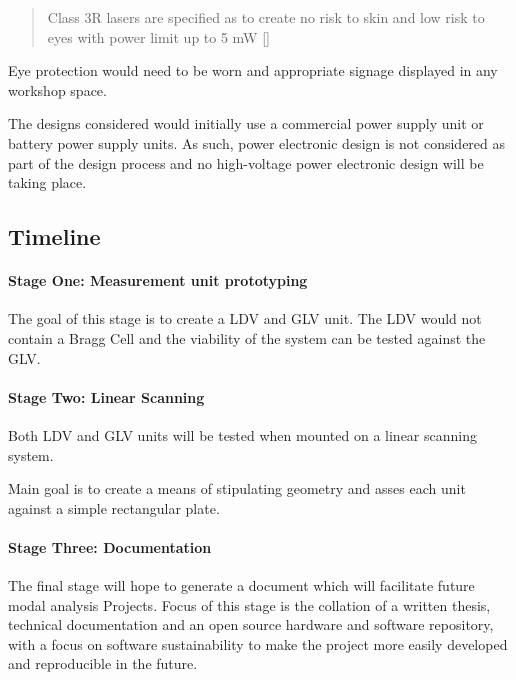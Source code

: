 \begin{quote}
Class 3R lasers are specified as to create no risk to skin and low risk to eyes
with power limit up to 5 mW [\cite{henderson_laser_2003}]
\end{quote}

Eye protection would need to be worn and appropriate signage displayed in any
workshop space.

The designs considered would initially use a commercial power supply unit or
battery power supply units. As such, power electronic design is not considered
as part of the design process and no high-voltage power electronic design will
be taking place.


\hypertarget{timeline}{%
\subsection{Timeline}\label{timeline}}

\paragraph{Stage One: Measurement unit prototyping}

The goal of this stage is to create a LDV and GLV unit. The LDV would not
contain a Bragg Cell and the viability of the system can be tested against the
GLV.

\paragraph{Stage Two: Linear Scanning}

Both LDV and GLV units will be tested when mounted on a linear scanning system.

Main goal is to create a means of stipulating geometry and asses each unit
against a simple rectangular plate.

\paragraph{Stage Three: Documentation}

The final stage will hope to generate a document which will facilitate future
modal analysis Projects. Focus of this stage is the collation of a written
thesis, technical documentation and an open source hardware and software
repository, with a focus on software sustainability to make the project more
easily developed and reproducible in the future.

\subsection{\cite{omodhrain_framework_2011}}

